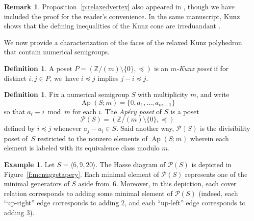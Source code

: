\documentclass[12pt]{amsart}
\theoremstyle{definition}
\newtheorem{example}[thm]{Example}
\newtheorem{remark}[thm]{Remark}
\newtheorem{defn}[thm]{Definition}
\numberwithin{equation}{section}
\newcommand{\ring}[1]{\ensuremath{\mathbb{#1}}}
\renewcommand\>{\rangle}
\newcommand\<{\langle}
\newcommand\0{\mathbf{0}}
\newcommand\ZZ{\ring{Z}}
\DeclareMathOperator\Ap{Ap} %
\begin{document}
\begin{remark}\label{r:relaxedvertex}
Proposition~\ref{p:relaxedvertex} also appeared in \cite[Proposition~1.1]{kunz}, though we have included the proof for the reader's convenience.  In the same manuscript, Kunz shows that the defining inequalities of the Kunz cone are irreduandant \cite[Proposition~1.2]{kunz}.  
\end{remark}

We now provide a characterization of the faces of the relaxed Kunz polyhedron that contain numerical semigroups.  

\begin{defn}\label{d:kunzposet}
A poset $P = (\ZZ/(m)\setminus\{0\}, \preceq)$ is an \emph{$m$-Kunz poset} if for distinct $i, j \in P$, we~have $i \preceq j$ implies $j - i \preceq j$.
\end{defn}

\begin{defn}\label{d:aperyposet}
Fix a numerical semigroup $S$ with multiplicity $m$, and write 
$$\Ap(S;m) = \{0, a_1, \ldots, a_{m-1}\}$$
so that $a_i \equiv i \bmod m$ for each $i$.  The \emph{Ap\'ery poset} of $S$ is a poset 
$$\mathcal P(S) = (\ZZ/(m)\setminus\{0\}, \preceq)$$ defined by $i \preceq j$ whenever $a_j - a_i \in S$.  Said another way, $\mathcal P(S)$ is the divisibility poset of~$S$ restricted to the nonzero elements of $\Ap(S;m)$ wherein each element is labeled with its equivalence class modulo $m$.  
\end{defn}

\begin{example}\label{e:mcnugget}
Let $S = \<6, 9, 20\>$.  The Hasse diagram of $\mathcal P(S)$ is depicted in Figure~\ref{f:mcnuggetapery}.  Each minimal element of $\mathcal P(S)$ represents one of the minimal generators of $S$ aside from~$6$.  Moreover, in this depiction, each cover relation corresponds to adding some minimal element of $\mathcal P(S)$ (indeed, each ``up-right'' edge corresponds to adding $2$, and each ``up-left'' edge corresponds to adding $3$).  
\end{example}
\end{document}
